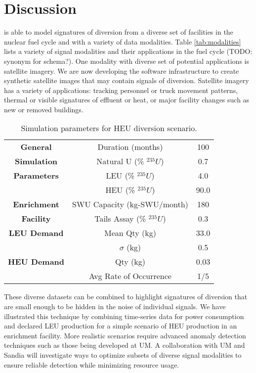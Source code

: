 \section{Discussion}
\label{s_dis}

\Cyclus is able to model signatures of diversion from a diverse set of facilities in the nuclear fuel cycle and with a variety of data modalities. Table \ref{tab:modalities} lists a variety of signal modalities and their applications in the fuel cycle (TODO: synonym for schema?).  One modality with diverse set of potential applications is satellite imagery.  We are now developing the software infrastructure to create synthetic satellite images that may contain signals of diversion. Satellite imagery has a variety of applications: tracking personnel or truck movement patterns, thermal or visible signatures of effluent or heat, or major facility changes such as new or removed buildings.

\begin{table}
\centering
\begin{tabular}{|c|c|c|}
\hline
\textbf{General}    & Duration (months)       & 100  \\
\textbf{Simulation} & Natural U (\% $^{235}U$) & 0.7  \\
\textbf{Parameters} & LEU (\% $^{235}U$)       & 4.0  \\
                    & HEU (\% $^{235}U$)       & 90.0 \\
\hline
\textbf{Enrichment} & SWU Capacity (kg-SWU/month) & 180  \\
\textbf{Facility}   & Tails Assay (\% $^{235}U$)   & 0.3  \\
\hline
\textbf{LEU Demand} & Mean Qty (kg)       & 33.0  \\
                    & $\sigma$ (kg)       & 0.5  \\
\hline
\textbf{HEU Demand} & Qty (kg)            & 0.03  \\
                    & Avg Rate of Occurrence & 1/5 \\ 
\hline
\end{tabular}
\caption{Simulation parameters for \gls{HEU} diversion scenario.}
\label{tab:sim_params}
\end{table}

These diverse datasets can be combined to highlight signatures of diversion that are small enough to be hidden in the noise of individual signals.  We have illustrated this technique by combining time-series data for power consumption and declared \gls{LEU} production for a simple scenario of \gls{HEU} production in an enrichment facility.  More realistic scenarios require advanced anomaly detection techniques such as those being developed at \gls{UM}. A collaboration with \gls{UM} and \gls{Sandia} will investigate ways to optimize subsets of diverse signal modalities to ensure reliable detection while minimizing resource usage.

